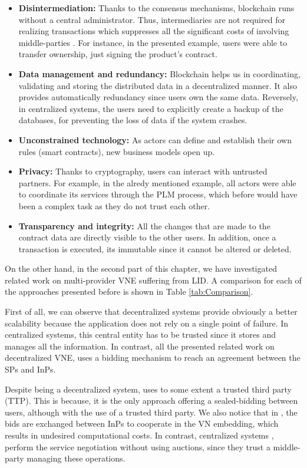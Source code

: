 \begin{itemize}
	\item \textbf{Disintermediation:} Thanks to the consensus mechanisms, blockchain runs without a central administrator. Thus, intermediaries are not required for realizing transactions which suppresses all the significant costs of involving middle-parties \citep{mainelli2015sharing}. For instance, in the presented example, users were able to transfer ownership, just signing the product's contract.
	\item \textbf{Data management and redundancy:} Blockchain helps us in coordinating, validating and storing the distributed data in a decentralized manner. It also provides automatically redundancy since users own the same data. Reversely, in centralized systems, the users need to explicitly create a backup of the databases, for preventing the loss of data if the system crashes.
	\item \textbf{Unconstrained technology:} As actors can define and establish their own rules (smart contracts), new business models open up.
	\item \textbf{Privacy:} Thanks to cryptography, users can interact with untrusted partners. For example, in the alredy mentioned example, all actors were able to coordinate its services through the PLM process, which before would have been a complex task as they do not trust each other.
    \item \textbf{Transparency and integrity:} All the changes that are made to the contract data are directly visible to the other users. In addition, once a transaction is executed, its immutable since it cannot be altered or deleted.
	
\end{itemize}

On the other hand, in the second part of this chapter, we have investigated related work on multi-provider VNE suffering from LID. A comparison for each of the approaches presented before is shown in Table \ref{tab:Comparison}.

First of all, we can observe that decentralized systems provide obviously a better scalability because the application does not rely on a single point of failure. In centralized systems, this central entity has to be trusted since it stores and manages all the information. In contrast, all the presented related work on decentralized VNE, uses a bidding mechanism to reach an agreement between the SPs and InPs.

Despite being a decentralized system, \cite{zaheer2010multi} uses to some extent a trusted third party (TTP). This is because, it is the only approach offering a sealed-bidding between users, although with the use of a trusted third party. We also notice that in \cite{esposito2013general}, \cite{chowdhury2010polyvine} the bids are exchanged between InPs to cooperate in the VN embedding, which results in undesired computational costs. In contrast, centralized systems \citep{dietrich2015multi}, perform the service negotiation without using auctions, since they trust a middle-party managing these operations.

